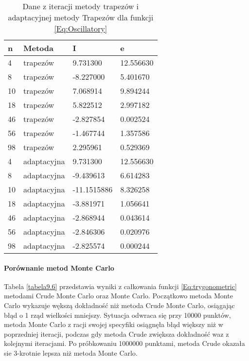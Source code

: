 \documentclass[12pt,twoside]{article}
\begin{document}
\begin{table}[H]
\centering 
\caption{Dane z iteracji metody trapezów i adaptacyjnej metody Trapezów dla funkcji \eqref{Eq:Oscillatory}}
\label{tabela9.5}
\begin{tabular}{llll}
\toprule
{n} & Metoda &  I &  e \\
\midrule
4  &     trapezów & 9.731300  &   12.556630 \\
8  &     trapezów & -8.227000 &   5.401670 \\
10  &    trapezów & 7.068914   &  9.894244  \\
18  &    trapezów & 5.822512  &   2.997182  \\
46  &    trapezów & -2.827854 &   0.002524   \\
56 &     trapezów & -1.467744  &  1.357586  \\
98 &     trapezów & 2.295961 &    0.529369  \\
\midrule
4  &     adaptacyjna & 9.731300 &   12.556630 \\
8  &     adaptacyjna & -9.439613 &   6.614283 \\
10  &    adaptacyjna & -11.1515886  &   8.326258  \\
18  &    adaptacyjna & -3.881971 &  1.056641  \\
46  &    adaptacyjna & -2.868944 &   0.043614  \\
56 &     adaptacyjna & -2.846306 &    0.020976  \\
98 &     adaptacyjna & -2.825574 &    0.000244  \\

\bottomrule
\end{tabular}
\end{table}


\paragraph{Porównanie metod Monte Carlo}\mbox{}


Tabela \ref{tabela9.6} przedstawia wyniki z całkowania funkcji \eqref{Eq:trygonometric} metodami Crude Monte Carlo oraz Monte Carlo. Początkowo metoda Monte Carlo wykazuje wększą dokładność niż metoda Crude Monte Carlo, osiągając błąd o 1 rząd wielkości mniejszy. Sytuacja odwraca się przy 10000 punktów, metoda Monte Carlo z racji swojej specyfiki osiągnęła błąd większy niż w poprzedniej iteracji, podczas gdy metoda Crude zwiększa dokładność waz z kolejnymi iteracjami. Po próbkowaniu 1000000 punktami, metoda Crude okazała sie 3-krotnie lepsza niż metoda Monte Carlo.
\end{document}
